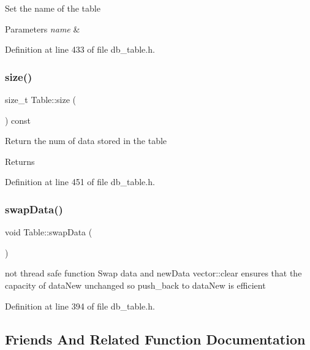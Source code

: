 Set the name of the table 
\begin{DoxyParams}{Parameters}
{\em name} & \\
\hline
\end{DoxyParams}


Definition at line 433 of file db\+\_\+table.\+h.

\mbox{\label{class_table_aec548eba07f9b3aebcde324c19e19fde}} 
\subsubsection{\texorpdfstring{size()}{size()}}
{\footnotesize\ttfamily size\+\_\+t Table\+::size (\begin{DoxyParamCaption}{ }\end{DoxyParamCaption}) const\hspace{0.3cm}{\ttfamily [inline]}}

Return the num of data stored in the table \begin{DoxyReturn}{Returns}

\end{DoxyReturn}


Definition at line 451 of file db\+\_\+table.\+h.

\mbox{\label{class_table_ae064a04cc7772a51f163f81f0187446e}} 
\subsubsection{\texorpdfstring{swap\+Data()}{swapData()}}
{\footnotesize\ttfamily void Table\+::swap\+Data (\begin{DoxyParamCaption}{ }\end{DoxyParamCaption})\hspace{0.3cm}{\ttfamily [inline]}}

not thread safe function Swap data and new\+Data vector\+::clear ensures that the capacity of data\+New unchanged so push\+\_\+back to data\+New is efficient 

Definition at line 394 of file db\+\_\+table.\+h.



\subsection{Friends And Related Function Documentation}
\mbox{\label{class_table_ac91202688e17b1c145b7d98d90ace349}} 

